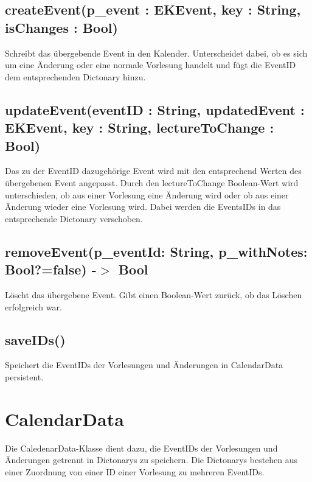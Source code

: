 \subsection[createEvent]{createEvent(p\_event : EKEvent, key : String, isChanges : Bool)}
Schreibt das übergebende Event in den Kalender. Unterscheidet dabei, ob es sich um eine Änderung oder eine normale Vorlesung handelt und fügt die EventID dem entsprechenden Dictonary hinzu. 

\subsection[updateEvent]{updateEvent(eventID : String, updatedEvent : EKEvent, key : String, lectureToChange : Bool)}
Das zu der EventID dazugehörige Event wird mit den entsprechend Werten des übergebenen Event angepasst. Durch den lectureToChange Boolean-Wert wird unterschieden, ob aus einer Vorlesung eine Änderung wird oder ob aus einer Änderung wieder eine Vorlesung wird. Dabei werden die EventsIDs in das entsprechende Dictonary verschoben.

\subsection[removeEvent]{removeEvent(p\_eventId: String, p\_withNotes: Bool?=false) -$>$ Bool}
Löscht das übergebene Event. Gibt einen Boolean-Wert zurück, ob das Löschen erfolgreich war.

\subsection[saveIDs]{saveIDs()}
Speichert die EventIDs der Vorlesungen und Änderungen in CalendarData persistent.

\newpage
\section{CalendarData}
Die CaledenarData-Klasse dient dazu, die EventIDs der Vorlesungen und Änderungen getrennt in Dictonarys zu speichern.
Die Dictonarys bestehen aus einer Zuordnung von einer ID einer Vorlesung zu mehreren EventIDs.

